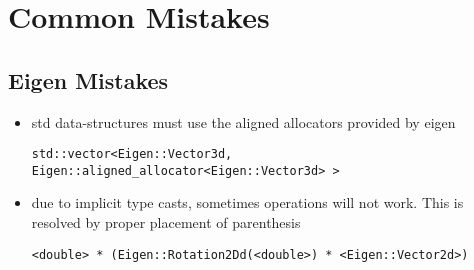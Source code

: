 \documentclass{article}
\begin{document}
\section{Common Mistakes}
\label{sec:mistakes}

\subsection{Eigen Mistakes}
\begin{itemize}
\item std data-structures must use the aligned allocators provided by eigen
\begin{verbatim}
std::vector<Eigen::Vector3d, Eigen::aligned_allocator<Eigen::Vector3d> >
\end{verbatim}

\item due to implicit type casts, sometimes operations will not work. This is resolved by proper placement of parenthesis
\begin{verbatim}
<double> * (Eigen::Rotation2Dd(<double>) * <Eigen::Vector2d>)
\end{verbatim}
\end{itemize}
\end{document}
